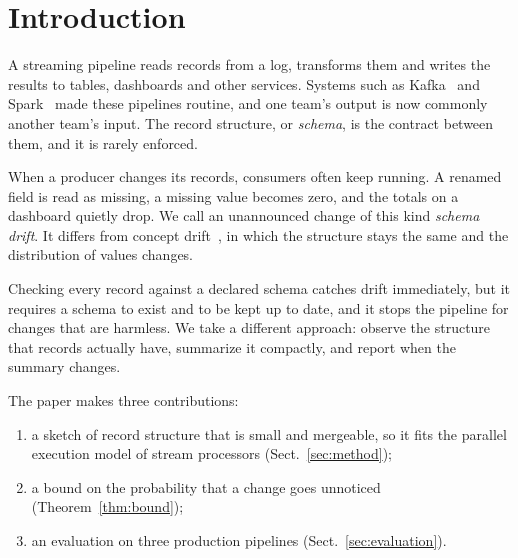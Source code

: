 \section{Introduction}\label{sec:introduction}
A streaming pipeline reads records from a log, transforms them and writes the results to tables, dashboards and other services. Systems such as Kafka~\cite{kreps2011kafka} and Spark~\cite{zaharia2012resilient} made these pipelines routine, and one team's output is now commonly another team's input. The record structure, or \emph{schema}, is the contract between them, and it is rarely enforced.

When a producer changes its records, consumers often keep running. A renamed field is read as missing, a missing value becomes zero, and the totals on a dashboard quietly drop. We call an unannounced change of this kind \emph{schema drift}. It differs from concept drift~\cite{gama2014survey}, in which the structure stays the same and the distribution of values changes.

Checking every record against a declared schema catches drift immediately, but it requires a schema to exist and to be kept up to date, and it stops the pipeline for changes that are harmless. We take a different approach: observe the structure that records actually have, summarize it compactly, and report when the summary changes.

The paper makes three contributions:
\begin{enumerate}
  \item a sketch of record structure that is small and mergeable, so it fits the parallel execution model of stream processors (Sect.~\ref{sec:method});
  \item a bound on the probability that a change goes unnoticed (Theorem~\ref{thm:bound});
  \item an evaluation on three production pipelines (Sect.~\ref{sec:evaluation}).
\end{enumerate}
